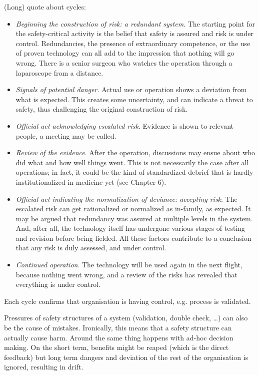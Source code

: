 (Long) quote about cycles:
\begin{itemize}
\item \emph{Beginning the construction of risk: a redundant system}. The starting point for the
safety-critical activity is the belief that safety is assured and risk is under
control. Redundancies, the presence of extraordinary competence, or the
use of proven technology can all add to the impression that nothing will
go wrong. There is a senior surgeon who watches the operation through
a laparoscope from a distance.
\item \emph{Signals of potential danger}. Actual use or operation shows a deviation from
what is expected. This creates some uncertainty, and can indicate a threat
to safety, thus challenging the original construction of risk.
\item \emph{Official act acknowledging escalated risk}. Evidence is shown to relevant people,
a meeting may be called.
\item \emph{Review of the evidence}. After the operation, discussions may ensue about
who did what and how well things went. This is not necessarily the case
after all operations; in fact, it could be the kind of standardized debrief
that is hardly institutionalized in medicine yet (see Chapter 6).
\item \emph{Official act indicating the normalization of deviance: accepting risk}. The escalated
risk can get rationalized or normalized as in-family, as expected. It may be
argued that redundancy was assured at multiple levels in the system. And,
after all, the technology itself has undergone various stages of testing and
revision before being fielded. All these factors contribute to a conclusion
that any risk is duly assessed, and under control.
\item \emph{Continued operation}. The technology will be used again in the next flight,
because nothing went wrong, and a review of the risks has revealed that
everything is under control.
\end{itemize}
Each cycle confirms that organisation is having control, e.g. process is validated.

Pressures of safety structures of a system (validation, double check, \ldots) can also be the cause of mistakes. 
Ironically, this means that a safety structure can actually cause harm.
Around the same thing happens with ad-hoc decision making. 
On the short term, benefits might be reaped (which is the direct feedback) but long term dangers and deviation of the rest of the organisation is ignored, resulting in drift.

